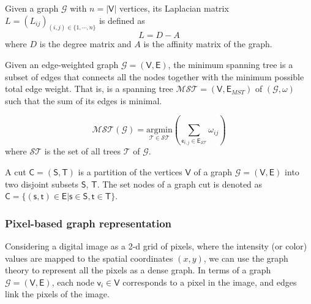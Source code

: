 \begin{definition}
	Given a graph $\mathcal{G}$ with $n=|\mathsf{V}|$ vertices, its Laplacian matrix $L = (L_{ij})_{(i, j)\in \{1,\cdots, n\}}$ is defined as 
	\begin{equation}	
		L = D - A  \nonumber 		
	\end{equation}	
where $D$ is the degree matrix and $A$ is the affinity matrix of the graph.
\end{definition}

\begin{definition}
	Given an edge-weighted graph $\mathcal{G}=(\mathsf{V}, \mathsf{E})$, the minimum spanning tree is a subset of edges that connects all the nodes together with the minimum possible total edge weight. That is, is a spanning tree $\mathcal{MST}=(\mathsf{V}, \mathsf{E}_{MST})$ of $(\mathcal{G}, \omega)$ such that
the sum of its edges is minimal.

\begin{equation}
	\mathcal{MST}(\mathcal{G}) = \underset{\mathcal{T} \in \mathcal{ST}}{\mathrm{argmin}} \left( \sum_{\mathsf{e}_{i,j} \in \mathsf{E}_\mathcal{ST}} \omega_{ij} \right) \nonumber
\end{equation}
where $\mathcal{ST}$ is the set of all trees $\mathcal{T}$ of $\mathcal{G}$.
\end{definition}

\begin{definition}
	A cut $\mathsf{C}=(\mathsf{S}, \mathsf{T})$ is a partition of the vertices $\mathsf{V}$ of a graph $\mathcal{G}=(\mathsf{V}, \mathsf{E})$ into two disjoint subsets $\mathsf{S}$, $\mathsf{T}$. The set nodes of a graph cut is denoted as $\mathsf{C}=\{ (\mathsf{s}, \mathsf{t}) \in \mathsf{E} | \mathsf{s} \in \mathsf{S}, \mathsf{t} \in \mathsf{T} \}$.
\end{definition}
%

\subsubsection{Pixel-based graph representation}

Considering a digital image as a 2-d grid of pixels, where the intensity (or color) values are mapped to the spatial coordinates $(x, y)$, we can use the graph theory to represent all the pixels as a dense graph. In terms of a graph $\mathcal{G}=(\mathsf{V}, \mathsf{E})$, each node $\mathsf{v}_i \in \mathsf{V}$ corresponds to a pixel in the image, and edges link the pixels of the image. 

